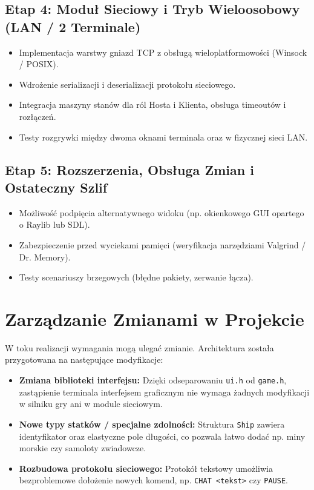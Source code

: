 \documentclass[11pt,a4paper]{article}
\begin{document}
\subsection*{Etap 4: Moduł Sieciowy i Tryb Wieloosobowy (LAN / 2 Terminale)}
\begin{itemize}[noitemsep]
    \item Implementacja warstwy gniazd TCP z obsługą wieloplatformowości (Winsock / POSIX).
    \item Wdrożenie serializacji i deserializacji protokołu sieciowego.
    \item Integracja maszyny stanów dla ról Hosta i Klienta, obsługa timeoutów i rozłączeń.
    \item Testy rozgrywki między dwoma oknami terminala oraz w fizycznej sieci LAN.
\end{itemize}

\subsection*{Etap 5: Rozszerzenia, Obsługa Zmian i Ostateczny Szlif}
\begin{itemize}[noitemsep]
    \item Możliwość podpięcia alternatywnego widoku (np. okienkowego GUI opartego o Raylib lub SDL).
    \item Zabezpieczenie przed wyciekami pamięci (weryfikacja narzędziami Valgrind / Dr. Memory).
    \item Testy scenariuszy brzegowych (błędne pakiety, zerwanie łącza).
\end{itemize}

\section{Zarządzanie Zmianami w Projekcie}
W toku realizacji wymagania mogą ulegać zmianie. Architektura została przygotowana na następujące modyfikacje:
\begin{itemize}[noitemsep]
    \item \textbf{Zmiana biblioteki interfejsu:} Dzięki odseparowaniu \texttt{ui.h} od \texttt{game.h}, zastąpienie terminala interfejsem graficznym nie wymaga żadnych modyfikacji w silniku gry ani w module sieciowym.
    \item \textbf{Nowe typy statków / specjalne zdolności:} Struktura \texttt{Ship} zawiera identyfikator oraz elastyczne pole długości, co pozwala łatwo dodać np. miny morskie czy samoloty zwiadowcze.
    \item \textbf{Rozbudowa protokołu sieciowego:} Protokół tekstowy umożliwia bezproblemowe dołożenie nowych komend, np. \texttt{CHAT <tekst>} czy \texttt{PAUSE}.
\end{itemize}
\end{document}
